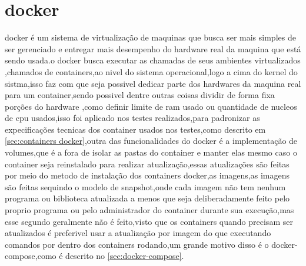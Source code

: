 \documentclass[
	12pt,				%
	openright,			%
	oneside,			%
	a4paper,			%
	english,			%
	french,				%
	spanish,			%
	brazil,				%
	]{abntex2}
\begin{document}
\section{docker}
\label{sec:docker}
docker é um sistema de virtualização de maquinas que busca ser mais simples de ser gerenciado e entregar mais desempenho do hardware real da maquina que está sendo usada.o docker busca executar as chamadas de seus ambientes virtualizados ,chamados de containers,ao nivel do sistema operacional,logo a cima do kernel do sistma,isso faz com que seja possivel dedicar parte dos hardwares da maquina real para um container,sendo possivel dentre outras coisas dividir de forma fixa porções do hardware ,como definir limite de ram usado ou quantidade de nucleos de cpu usados,isso foi aplicado nos testes realizados,para padronizar as expecificações tecnicas dos container usados nos testes,como descrito em \autoref{sec:containers docker},outra das funcionalidades do docker é a implementação de volumes,que é a fora de isolar as pastas do container e manter elas mesmo caso o container seja reinstalado para realizar atualização,essas atualizações são feitas por meio do metodo de instalação dos containers docker,as imagens,as imagens são feitas sequindo o modelo de snapshot,onde cada imagem não tem nenhum programa ou biblioteca atualizada a menos que seja deliberadamente feito pelo proprio programa ou pelo administrador do container durante sua execução,mas esse segundo geralmente não é feito,visto que os containers quando precisam ser atualizados é preferivel usar a atualização por imagem do que executando comandos por dentro dos containers rodando,um grande motivo disso é o docker-compose,como é descrito no \autoref{sec:docker-compose}.
\end{document}
